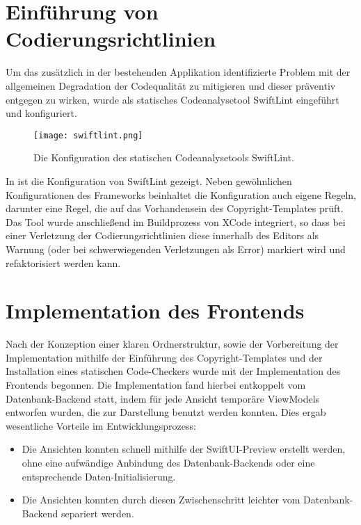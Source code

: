 \section{Einführung von Codierungsrichtlinien}

Um das zusätzlich in der bestehenden Applikation identifizierte Problem mit der allgemeinen Degradation der Codequalität zu mitigieren und dieser präventiv entgegen zu wirken, wurde als statisches Codeanalysetool SwiftLint eingeführt und konfiguriert.

\begin{figure}[H]
\texttt{[image: swiftlint.png]}
\caption{Die Konfiguration des statischen Codeanalysetools SwiftLint.}\label{fig:swiftlint}
\end{figure}

\noindent In  ist die Konfiguration von SwiftLint gezeigt. Neben gewöhnlichen Konfigurationen des Frameworks beinhaltet die Konfiguration auch eigene Regeln, darunter eine Regel, die auf das Vorhandensein des Copyright-Templates prüft. Das Tool wurde anschließend im Buildprozess von XCode integriert, so dass bei einer Verletzung der Codierungsrichtlinien diese innerhalb des Editors als Warnung (oder bei schwerwiegenden Verletzungen als Error) markiert wird und refaktorisiert werden kann.

\section{Implementation des Frontends}

Nach der Konzeption einer klaren Ordnerstruktur, sowie der Vorbereitung der Implementation mithilfe der Einführung des Copyright-Templates und der Installation eines statischen Code-Checkers wurde mit der Implementation des Frontends begonnen. Die Implementation fand hierbei entkoppelt vom Datenbank-Backend statt, indem für jede Ansicht temporäre ViewModels entworfen wurden, die zur Darstellung benutzt werden konnten. Dies ergab wesentliche Vorteile im Entwicklungsprozess:

\begin{itemize}
\item Die Ansichten konnten schnell mithilfe der SwiftUI-Preview erstellt werden, ohne eine aufwändige Anbindung des Datenbank-Backends oder eine entsprechende Daten-Initialisierung.
\item Die Ansichten konnten durch diesen Zwischenschritt leichter vom Datenbank-Backend separiert werden.
\end{itemize}

